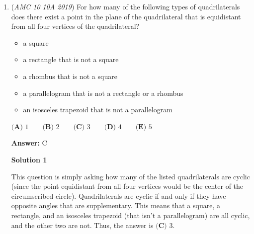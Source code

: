 \begin{enumerate}
 



\textbf{Solution 2a (more detailed ver. of Solution 2)}

Note that the sum of $n$ consecutive integers whose mean (median; the two are equal in this case) is $a$ is equal to $an$. Here, we want to maximize $n$ such that $an=45$. The mean/median of a set of consecutive integers is either an integer or half of an integer; clearly, $n$ is maximized when $a=0.5$ and $n=\boxed{\textbf{(D) }90}$. 

 



\textbf{Solution 3}

If we want the answer to have as many terms as possible, we need to make as many terms cancel out as much as we can. Because $45 - 1 <$ $\frac12$60 so we can eliminate $E$. Now lets make every integer cancel to zero except for $45$ and then we account for $0$ and $45$ to get $44*2+1+1=\boxed{\textbf{(D) }90}$. Pls help me clarify idk how to explain it clearer.

 


	\item (\textit{AMC 10 10A 2019}) For how many of the following types of quadrilaterals does there exist a point in the plane of the quadrilateral that is equidistant from all four vertices of the quadrilateral?


 
            \begin{itemize}
        \item a square

        \item a rectangle that is not a square

        \item a rhombus that is not a square

        \item a parallelogram that is not a rectangle or a rhombus

        \item an isosceles trapezoid that is not a parallelogram
            \end{itemize}
            $\textbf{(A) } 1 \qquad\textbf{(B) } 2 \qquad\textbf{(C) } 3 \qquad\textbf{(D) } 4 \qquad\textbf{(E) } 5$

 \textbf{Answer: }C



\textbf{Solution 1}

This question is simply asking how many of the listed quadrilaterals are cyclic (since the point equidistant from all four vertices would be the center of the circumscribed circle). Quadrilaterals are cyclic if and only if they have opposite angles that are supplementary. This means that a square, a rectangle, and an isosceles trapezoid (that isn't a parallelogram) are all cyclic, and the other two are not. Thus, the answer is $\boxed{\textbf{(C) } 3}$.


\end{enumerate}
